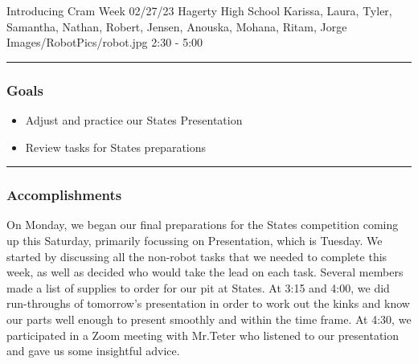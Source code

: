 \insertmeeting 
	{Introducing Cram Week} 
	{02/27/23} 
	{Hagerty High School}
	{Karissa, Laura, Tyler, Samantha, Nathan, Robert, Jensen, Anouska, Mohana, Ritam, Jorge}
	{Images/RobotPics/robot.jpg}
	{2:30 - 5:00}
	
\noindent\hfil\rule{\textwidth}{.4pt}\hfil
\subsubsection*{Goals}
\begin{itemize}
    \item Adjust and practice our States Presentation
    \item Review tasks for States preparations
\end{itemize} 

\noindent\hfil\rule{\textwidth}{.4pt}\hfil

\subsubsection*{Accomplishments}
On Monday, we began our final preparations for the States competition coming up this Saturday, primarily focussing on Presentation, which is Tuesday. We started by discussing all the non-robot tasks that we needed to complete this week, as well as decided who would take the lead on each task. Several members made a list of supplies to order for our pit at States. At 3:15 and 4:00, we did run-throughs of tomorrow’s presentation in order to work out the kinks and know our parts well enough to present smoothly and within the time frame. At 4:30, we participated in a Zoom meeting with Mr.Teter who listened to our presentation and gave us some insightful advice.

 


